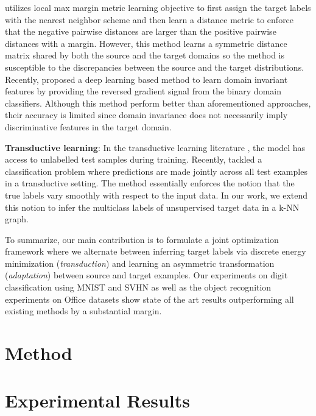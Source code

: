 \documentclass{article}
\begin{document}
\cite{tommasi13} utilizes local max margin metric learning objective \cite{lmnn} to first assign the target labels with the nearest neighbor scheme and then learn a distance metric to enforce that the negative pairwise distances are larger than the positive pairwise distances with a margin. However, this method learns a symmetric distance matrix shared by both the source and the target domains so the method is susceptible to the discrepancies between the source and the target distributions. Recently, \cite{ganin15, tzeng14} proposed a deep learning based method to learn domain invariant features by providing the reversed gradient signal from the binary domain classifiers. Although this method perform better than aforementioned approaches, their accuracy is limited since domain invariance does not necessarily imply discriminative features in the target domain. 

\textbf{Transductive learning}: In the transductive learning literature \cite{transduction}, the model has access to unlabelled test samples during training. Recently, \cite{coclassification} tackled a classification problem where predictions are made jointly across all test examples in a transductive \cite{transduction} setting. The method essentially enforces the notion that the true labels vary smoothly with respect to the input data. In our work, we extend this notion to infer the multiclass labels of unsupervised target data in a k-NN graph. 

To summarize, our main contribution is to formulate a joint optimization framework where we alternate between inferring target labels via discrete energy minimization (\textit{transduction}) and learning an asymmetric transformation (\textit{adaptation}) between source and target examples. Our experiments on digit classification using MNIST \cite{mnist} and SVHN\cite{svhn} as well as the object recognition experiments on Office \cite{office} datasets show state of the art results outperforming all existing methods by a substantial margin.


\section{Method} 



\section{Experimental Results}

\end{document}
